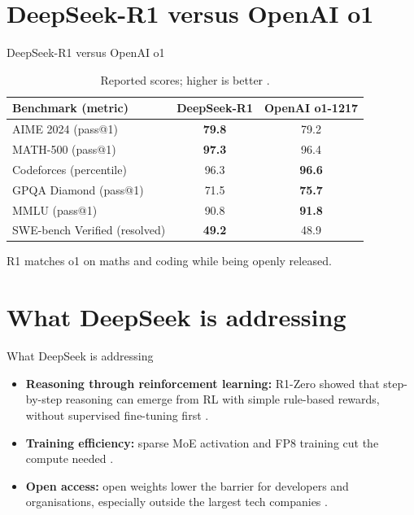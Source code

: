 \documentclass[xcolor=svgnames]{beamer}
\begin{document}
\section{DeepSeek-R1 versus OpenAI o1}
\begin{frame}{DeepSeek-R1 versus OpenAI o1}
\begin{table}
\centering
\begin{tabular}{lcc}
\toprule
\textbf{Benchmark (metric)} & \textbf{DeepSeek-R1} & \textbf{OpenAI o1-1217} \\
\midrule
AIME 2024 (pass@1) & \textbf{79.8} & 79.2 \\
MATH-500 (pass@1) & \textbf{97.3} & 96.4 \\
Codeforces (percentile) & 96.3 & \textbf{96.6} \\
GPQA Diamond (pass@1) & 71.5 & \textbf{75.7} \\
MMLU (pass@1) & 90.8 & \textbf{91.8} \\
SWE-bench Verified (resolved) & \textbf{49.2} & 48.9 \\
\bottomrule
\end{tabular}
\caption{Reported scores; higher is better \cite{deepseekr1github}.}
\end{table}
R1 matches o1 on maths and coding while being openly released.
\end{frame}

\section{What DeepSeek is addressing}
\begin{frame}{What DeepSeek is addressing}
\begin{block}{}
\begin{itemize}
  \item \textbf{Reasoning through reinforcement learning:} R1-Zero showed that step-by-step reasoning can emerge from RL with simple rule-based rewards, without supervised fine-tuning first \cite{guo2025deepseekr1}.
  \item \textbf{Training efficiency:} sparse MoE activation and FP8 training cut the compute needed \cite{liu2024deepseek}.
  \item \textbf{Open access:} open weights lower the barrier for developers and organisations, especially outside the largest tech companies \cite{krause2025deepseek}.
\end{itemize}
\end{block}
\end{frame}
\end{document}
